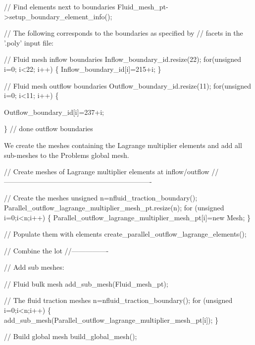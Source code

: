 \begin{DoxyCodeInclude}
 
 \textcolor{comment}{// Find elements next to boundaries}
 Fluid\_mesh\_pt->setup\_boundary\_element\_info();

 \textcolor{comment}{// The following corresponds to the boundaries as specified by}
 \textcolor{comment}{// facets in the '.poly' input file:}

 \textcolor{comment}{// Fluid mesh inflow boundaries}
 Inflow\_boundary\_id.resize(22);
 \textcolor{keywordflow}{for}(\textcolor{keywordtype}{unsigned} i=0; i<22; i++)
  \{
   Inflow\_boundary\_id[i]=215+i;
  \}
 
 \textcolor{comment}{// Fluid mesh outflow boundaries}
 Outflow\_boundary\_id.resize(11);
 \textcolor{keywordflow}{for}(\textcolor{keywordtype}{unsigned} i=0; i<11; i++)
  \{

   Outflow\_boundary\_id[i]=237+i;

  \} \textcolor{comment}{// done outflow boundaries}

\end{DoxyCodeInclude}


We create the meshes containing the Lagrange multiplier elements and add all sub-\/meshes to the Problem\textquotesingle{}s global mesh.


\begin{DoxyCodeInclude}


 \textcolor{comment}{// Create meshes of Lagrange multiplier elements at inflow/outflow}
 \textcolor{comment}{//----------------------------------------------------------------}

 \textcolor{comment}{// Create the meshes}
 \textcolor{keywordtype}{unsigned} n=nfluid\_traction\_boundary();
 Parallel\_outflow\_lagrange\_multiplier\_mesh\_pt.resize(n);
 \textcolor{keywordflow}{for} (\textcolor{keywordtype}{unsigned} i=0;i<n;i++)
  \{
   Parallel\_outflow\_lagrange\_multiplier\_mesh\_pt[i]=\textcolor{keyword}{new} Mesh;
  \} 
 
 \textcolor{comment}{// Populate them with elements}
 create\_parallel\_outflow\_lagrange\_elements();

 
 \textcolor{comment}{// Combine the lot}
 \textcolor{comment}{//----------------}
 
 \textcolor{comment}{// Add sub meshes:}

 \textcolor{comment}{// Fluid bulk mesh}
 add\_sub\_mesh(Fluid\_mesh\_pt);
 
 \textcolor{comment}{// The fluid traction meshes}
 n=nfluid\_traction\_boundary();
 \textcolor{keywordflow}{for} (\textcolor{keywordtype}{unsigned} i=0;i<n;i++)
  \{ 
   add\_sub\_mesh(Parallel\_outflow\_lagrange\_multiplier\_mesh\_pt[i]);
  \}
 
 \textcolor{comment}{// Build global mesh}
 build\_global\_mesh();

\end{DoxyCodeInclude}


